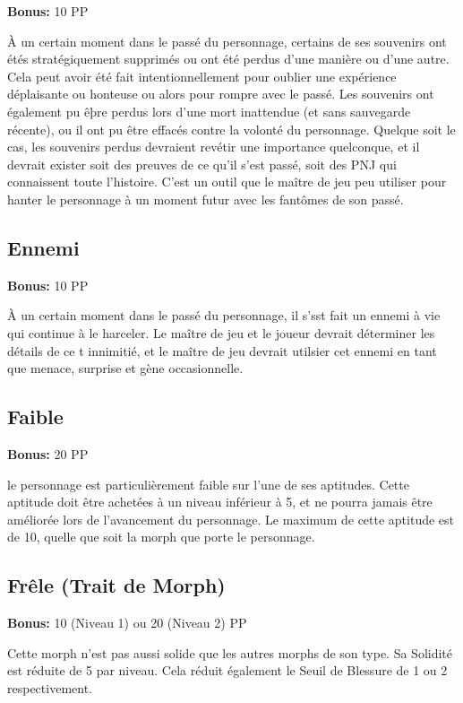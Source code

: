 \textbf{Bonus:} 10 PP 

À un certain moment dans le passé du personnage, certains de ses souvenirs ont étés stratégiquement supprimés ou ont été perdus d'une manière ou d'une autre. Cela peut avoir été fait intentionnellement pour oublier une expérience déplaisante ou honteuse ou alors pour rompre avec le passé. Les souvenirs ont également pu êþre perdus lors d'une mort inattendue (et sans sauvegarde récente), ou il ont pu être effacés contre la volonté du personnage. Quelque soit le cas, les souvenirs perdus devraient revétir une importance quelconque, et il devrait exister soit des preuves de ce qu'il s'est passé, soit des PNJ qui connaissent toute l'histoire. C'est un outil que le maître de jeu peu utiliser pour hanter le personnage à un moment futur avec les fantômes de son passé. 

\subsection{Ennemi} \label{sec:traits-enemy} 

\textbf{Bonus:} 10 PP 

À un certain moment dans le passé du personnage, il s'sst fait un ennemi à vie qui continue à le harceler. Le maître de jeu et le joueur devrait déterminer les détails de ce t innimitié, et le maître de jeu devrait utilsier cet ennemi en tant que menace, surprise et gène occasionnelle. 

\subsection{Faible} \label{sec:traits-feeble} 

\textbf{Bonus:} 20 PP 

le personnage est particulièrement faible sur l'une de ses aptitudes. Cette aptitude doit être achetées à un niveau inférieur à 5, et ne pourra jamais être améliorée lors de l'avancement du personnage. Le maximum de cette aptitude est de 10, quelle que soit la morph que porte le personnage. 

\subsection{Frêle (Trait de Morph)} \label{sec:traits-frail} 

\textbf{Bonus:} 10 (Niveau 1) ou 20 (Niveau 2) PP 

Cette morph n'est pas aussi solide que les autres morphs de son type. Sa Solidité est réduite de 5 par niveau. Cela réduit également le Seuil de Blessure de 1 ou 2 respectivement. 

